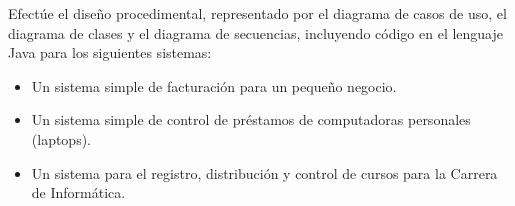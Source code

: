 Efectúe el diseño procedimental, representado por el diagrama de casos de uso, el diagrama de clases y el diagrama de secuencias, incluyendo código en el lenguaje Java para los siguientes sistemas:

\begin{itemize}
\item Un sistema simple de facturación para un pequeño negocio.
\item Un sistema simple de control de préstamos de computadoras personales (laptops).
\item Un sistema para el registro, distribución y control de cursos para la Carrera de Informática.
\end{itemize}
